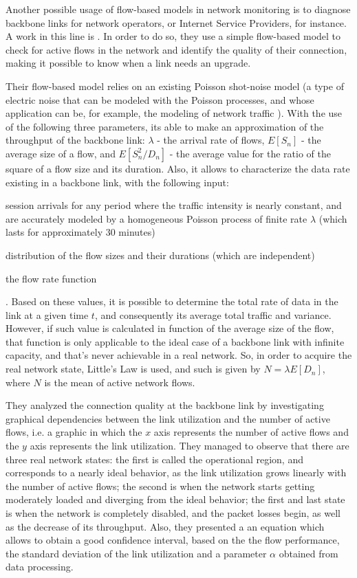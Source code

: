 \documentclass[runningheads,a4paper]{llncs}
\begin{document}
Another possible usage of flow-based models in network monitoring is to diagnose backbone links for network operators, or Internet Service Providers, for instance. A work in this line is \cite{sukhov2009active}. In order to do so, they use a simple flow-based model to check for active flows in the network and identify the quality of their connection, making it possible to know when a link needs an upgrade. 


Their flow-based model relies on an existing Poisson shot-noise model (a type of electric noise that can be modeled with the Poisson processes, and whose application can be, for example, the modeling of network traffic \cite{kluppelberg1995explosive}). With the use of the following three parameters, its able to make an approximation of the throughput of the backbone link: $ \lambda $ - the arrival rate of flows, $ E[S_{n}] $ - the average size of a flow, and $ E[S_{n}^2 / D_{n}] $ - the average value for the ratio of the square of a flow size and its duration. Also, it allows to characterize the data rate existing in a backbone link, with the following input: 
\begin{enumerate*}
\item session arrivals for any period where the traffic intensity is nearly constant, and are accurately modeled by a homogeneous Poisson process of finite rate $ \lambda $ (which lasts for approximately 30 minutes)
\item distribution of the flow sizes and their durations (which are independent)
\item the flow rate function
\end{enumerate*}
. Based on these values, it is possible to determine the total rate of data in the link at a given time $ t $, and consequently its average total traffic and variance. However, if such value is calculated in function of the average size of the flow, that function is only applicable to the ideal case of a backbone link with infinite capacity, and that's never achievable in a real network. So, in order to acquire the real network state, Little's Law is used, and such is given by $ N = \lambda E[D_{n}] $, where $ N $ is the mean of active network flows.

They analyzed the connection quality at the backbone link by investigating graphical dependencies between the link utilization and the number of active flows, i.e. a graphic in which the $ x $ axis represents the number of active flows and the $ y $ axis represents the link utilization. They managed to observe that there are three real network states: the first is called the operational region, and corresponds to a nearly ideal behavior, as the link utilization grows linearly with the number of active flows; the second is when the network starts getting moderately loaded and diverging from the ideal behavior; the first and last state is when the network is completely disabled, and the packet losses begin, as well as the decrease of its throughput. Also, they presented a an equation which allows to obtain a good confidence interval, based on the the flow performance, the standard deviation of the link utilization and a parameter $ \alpha $ obtained from data processing. 
\end{document}
